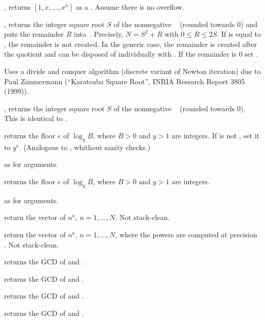 , returns $[1,x,\ldots,x^n]$ as a
. Assume there is no overflow.

, returns the integer square root $S$ of
the nonnegative ~ (rounded towards 0) and puts the remainder
$R$ into~. Precisely, $N = S^2 + R$ with $0\leq R \leq 2S$. If
 is equal to , the remainder is not created. In the generic
case, the remainder is created after the quotient and can be disposed of
individually with . If the remainder is $0$ set .

Uses a divide and conquer algorithm (discrete variant of Newton iteration)
due to Paul Zimmermann (``Karatsuba Square Root'', INRIA Research Report 3805
(1999)).

, returns the integer square root $S$ of
the nonnegative ~ (rounded towards 0). This is identical
to .

returns the floor $e$ of $\log_y B$, where $B > 0$ and $y > 1$ are integers.
If  is not , set it to $y^e$. (Analogous to ,
whithout sanity checks.)

 as  for
 arguments.

 returns the floor $e$ of $\log_y B$, where
$B > 0$ and $y > 1$ are integers.

 as  for
 arguments.

 return the vector of $n^a$, $n = 1,
\dots, N$. Not stack-clean.

 return the vector of $n^a$, $n
= 1, \dots, N$, where the powers are computed at precision . Not
stack-clean.


 returns the GCD of  and .

 returns the GCD of  and .

 returns the GCD of  and .

 returns the GCD of  and .

